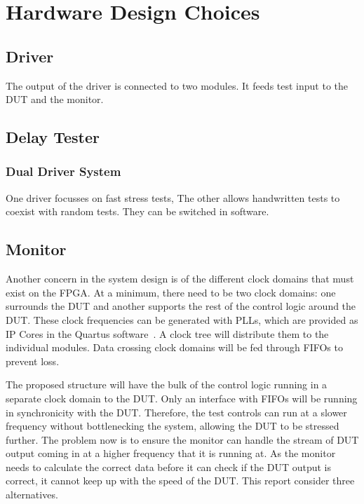 \section{Hardware Design Choices}



\subsection{Driver}


The output of the driver is connected to two modules.
It feeds test input to the DUT and the monitor.



\subsection{Delay Tester}

\subsubsection{Dual Driver System}
One driver focusses on fast stress tests, The other allows handwritten tests to coexist with random tests.
They can be switched in software.


\subsection{Monitor}

Another concern in the system design is of the different clock domains that must exist on the FPGA.
At a minimum, there need to be two clock domains: one surrounds the DUT and another supports the rest of the control logic around the DUT.
These clock frequencies can be generated with PLLs, which are provided as IP Cores in the Quartus software~\cite{Altera4}.
A clock tree will distribute them to the individual modules.
Data crossing clock domains will be fed through FIFOs to prevent loss.

The proposed structure will have the bulk of the control logic running in a separate clock domain to the DUT.
Only an interface with FIFOs will be running in synchronicity with the DUT.
Therefore, the test controls can run at a slower frequency without bottlenecking the system, allowing the DUT to be stressed further.
The problem now is to ensure the monitor can handle the stream of DUT output coming in at a higher frequency that it is running at.
As the monitor needs to calculate the correct data before it can check if the DUT output is correct, it cannot keep up with the speed of the DUT.
This report consider three alternatives.

